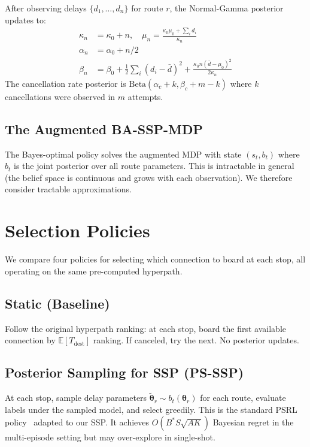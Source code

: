 \documentclass[journal]{IEEEtran}
\begin{document}
After observing delays $\{d_1, \ldots, d_n\}$ for route $r$, the Normal-Gamma posterior updates to:
\begin{align}
    \kappa_n &= \kappa_0 + n, \quad \mu_n = \frac{\kappa_0 \mu_0 + \sum_i d_i}{\kappa_n} \\
    \alpha_n &= \alpha_0 + n/2 \\
    \beta_n &= \beta_0 + \tfrac{1}{2}\textstyle\sum_i (d_i - \bar{d})^2 + \frac{\kappa_0 n(\bar{d} - \mu_0)^2}{2\kappa_n}
\end{align}
The cancellation rate posterior is $\text{Beta}(\alpha_c + k, \beta_c + m - k)$ where $k$ cancellations were observed in $m$ attempts.

\subsection{The Augmented BA-SSP-MDP}

The Bayes-optimal policy solves the augmented MDP with state $(s_t, b_t)$ where $b_t$ is the joint posterior over all route parameters. This is intractable in general (the belief space is continuous and grows with each observation). We therefore consider tractable approximations.

\section{Selection Policies}
\label{sec:policies}

We compare four policies for selecting which connection to board at each stop, all operating on the same pre-computed hyperpath.

\subsection{Static (Baseline)}

Follow the original hyperpath ranking: at each stop, board the first available connection by $\mathbb{E}[T_{\mathrm{dest}}]$ ranking. If canceled, try the next. No posterior updates.

\subsection{Posterior Sampling for SSP (PS-SSP)}
\label{sec:psrl}

At each stop, sample delay parameters $\tilde{\bm{\theta}}_r \sim b_t(\bm{\theta}_r)$ for each route, evaluate labels under the sampled model, and select greedily. This is the standard PSRL policy~\cite{osband2017} adapted to our SSP. It achieves $O(B^* S\sqrt{AK})$ Bayesian regret in the multi-episode setting but may over-explore in single-shot.
\end{document}

